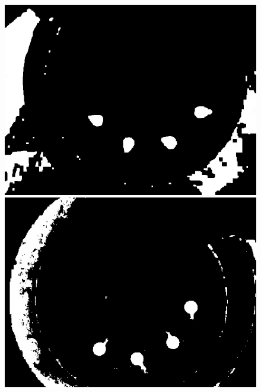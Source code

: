 \documentclass[a4paper]{ctexart}
\begin{document}
\begin{enumerate}[label=\arabic*、]
\begin{enumerate}[label=\alph*)]
\begin{figure}[htbp]
\begin{minipage}[t]{0.25\textwidth}
			\end{minipage}\\
			\begin{minipage}[t]{0.25\textwidth}
				\centering
				\includegraphics[width=\textwidth]{figure/open_1/img3.jpg}
			\end{minipage}
			\begin{minipage}[t]{0.25\textwidth}
				\centering
				\includegraphics[width=\textwidth]{figure/open_1/img4.jpg}
			\end{minipage}
			\begin{minipage}[t]{0.25\textwidth}
				\centering

\end{minipage}
\end{figure}
\end{enumerate}
\end{enumerate}
\end{document}
